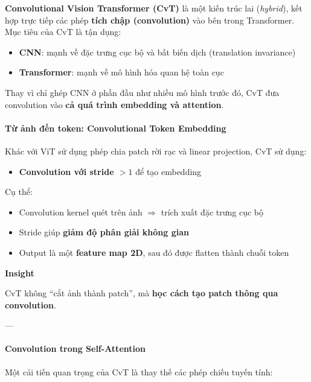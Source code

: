 \textbf{Convolutional Vision Transformer (CvT)} \cite{Wu2021} là một kiến trúc lai (\textit{hybrid}), kết hợp trực tiếp các phép \textbf{tích chập (convolution)} vào bên trong Transformer.  
Mục tiêu của CvT là tận dụng:
\begin{itemize}
	\item \textbf{CNN}: mạnh về đặc trưng cục bộ và bất biến dịch (translation invariance)
	\item \textbf{Transformer}: mạnh về mô hình hóa quan hệ toàn cục
\end{itemize}

Thay vì chỉ ghép CNN ở phần đầu như nhiều mô hình trước đó, CvT đưa convolution vào \textbf{cả quá trình embedding và attention}.

\paragraph{Từ ảnh đến token: Convolutional Token Embedding}

Khác với ViT sử dụng phép chia patch rời rạc và linear projection, CvT sử dụng:

\begin{itemize}
	\item \textbf{Convolution với stride $>1$} để tạo embedding
\end{itemize}

Cụ thể:
\begin{itemize}
	\item Convolution kernel quét trên ảnh $\Rightarrow$ trích xuất đặc trưng cục bộ
	\item Stride giúp \textbf{giảm độ phân giải không gian}
	\item Output là một \textbf{feature map 2D}, sau đó được flatten thành chuỗi token
\end{itemize}

\begin{mdframed}[style=infobox]
	\textbf{Insight}
	
	CvT không “cắt ảnh thành patch”, mà \textbf{học cách tạo patch thông qua convolution}.
\end{mdframed}

---

\paragraph{Convolution trong Self-Attention}

Một cải tiến quan trọng của CvT là thay thế các phép chiếu tuyến tính:

